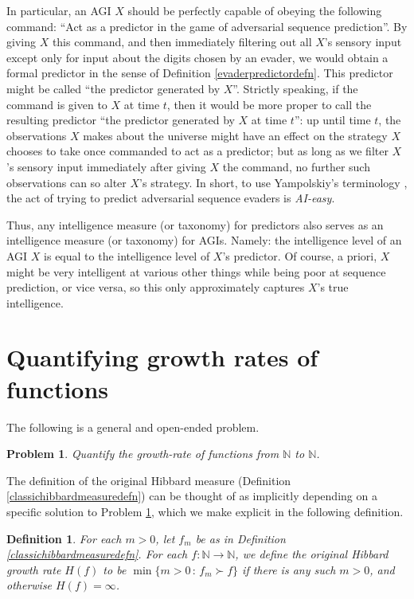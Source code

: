 \documentclass{article}
\newtheorem{definition}[theorem]{Definition}
\newtheorem{problem}[theorem]{Problem}
\begin{document}
In particular, an AGI $X$ should be perfectly capable of obeying the following command:
``Act as a predictor in the game of adversarial sequence prediction''.
By giving $X$ this command, and then immediately filtering out all $X$'s
sensory input except only for input about the digits chosen by an evader,
we would obtain a formal predictor in the sense of Definition \ref{evaderpredictordefn}.
This predictor might be called ``the predictor generated by $X$''. Strictly speaking,
if the command is given to $X$ at time $t$, then it would be more proper to call
the resulting predictor ``the predictor generated by $X$ at time $t$'': up until
time $t$, the observations $X$ makes about the universe might have an effect on
the strategy $X$ chooses to take once commanded to act as a predictor; but as long
as we filter $X$'s sensory input immediately after giving $X$ the command, no
further such observations can so alter $X$'s strategy.
In short, to use Yampolskiy's terminology \cite{yampolskiy2012ai}, the act of
trying to predict adversarial sequence evaders is \emph{AI-easy}.

Thus, any intelligence measure (or taxonomy) for predictors also serves as an intelligence
measure (or taxonomy) for AGIs. Namely: the intelligence level of an AGI $X$ is equal to the
intelligence level of $X$'s predictor. Of course, a priori,
$X$ might be very intelligent at various other things while being poor
at sequence prediction, or vice versa, so this only
approximately captures $X$'s true intelligence.


\section{Quantifying growth rates of functions}
\label{growthratesection}

The following is a general and open-ended problem.

\begin{problem}
\label{bigoproblem}
    Quantify the growth-rate of functions from $\mathbb N$ to $\mathbb N$.
\end{problem}

The definition of the original Hibbard measure
(Definition \ref{classichibbardmeasuredefn})
can be thought of as implicitly depending on a specific solution to Problem
\ref{bigoproblem}, which we make explicit in the following definition.

\begin{definition}
\label{hibbardgrowthratedefn}
    For each $m>0$, let $f_m$ be as in Definition \ref{classichibbardmeasuredefn}.
    For each $f:\mathbb N\to\mathbb N$, we define the \emph{original Hibbard growth rate}
    $H(f)$ to be $\min\{m>0\,:\,f_m\succ f\}$ if there is any such $m>0$, and otherwise
    $H(f)=\infty$.
\end{definition}
\end{document}
